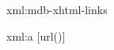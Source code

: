 
\startxmlsetups xml:mdb-xhtml-links
\stopxmlsetups


\startxmlsetups xml:a
	[url()]
\stopxmlsetups

